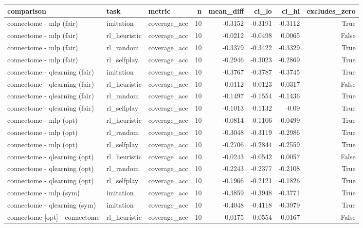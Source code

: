 \begin{table}[t]
\centering
\small
\begin{tabular}{lllrrrrr}
\toprule
comparison & task & metric & n & mean\_diff & ci\_lo & ci\_hi & excludes\_zero \\
\midrule
connectome - mlp (fair) & imitation & coverage\_acc & 10 & -0.3152 & -0.3191 & -0.3112 & True \\
connectome - mlp (fair) & rl\_heuristic & coverage\_acc & 10 & -0.0212 & -0.0498 & 0.0065 & False \\
connectome - mlp (fair) & rl\_random & coverage\_acc & 10 & -0.3379 & -0.3422 & -0.3329 & True \\
connectome - mlp (fair) & rl\_selfplay & coverage\_acc & 10 & -0.2946 & -0.3023 & -0.2869 & True \\
connectome - qlearning (fair) & imitation & coverage\_acc & 10 & -0.3767 & -0.3787 & -0.3745 & True \\
connectome - qlearning (fair) & rl\_heuristic & coverage\_acc & 10 & 0.0112 & -0.0123 & 0.0317 & False \\
connectome - qlearning (fair) & rl\_random & coverage\_acc & 10 & -0.1497 & -0.1554 & -0.1436 & True \\
connectome - qlearning (fair) & rl\_selfplay & coverage\_acc & 10 & -0.1013 & -0.1132 & -0.09 & True \\
connectome - mlp (opt) & rl\_heuristic & coverage\_acc & 10 & -0.0814 & -0.1106 & -0.0499 & True \\
connectome - mlp (opt) & rl\_random & coverage\_acc & 10 & -0.3048 & -0.3119 & -0.2986 & True \\
connectome - mlp (opt) & rl\_selfplay & coverage\_acc & 10 & -0.2706 & -0.2844 & -0.2559 & True \\
connectome - qlearning (opt) & rl\_heuristic & coverage\_acc & 10 & -0.0243 & -0.0542 & 0.0057 & False \\
connectome - qlearning (opt) & rl\_random & coverage\_acc & 10 & -0.2243 & -0.2377 & -0.2108 & True \\
connectome - qlearning (opt) & rl\_selfplay & coverage\_acc & 10 & -0.1966 & -0.2121 & -0.1826 & True \\
connectome - mlp (sym) & imitation & coverage\_acc & 10 & -0.3859 & -0.3948 & -0.3771 & True \\
connectome - qlearning (sym) & imitation & coverage\_acc & 10 & -0.4048 & -0.4118 & -0.3979 & True \\
connectome [opt] - connectome & rl\_heuristic & coverage\_acc & 10 & -0.0175 & -0.0554 & 0.0167 & False \\

\end{tabular}
\end{table}

